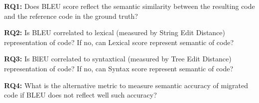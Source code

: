 \textbf{RQ1:} Does BLEU score reflect the semantic similarity between
the resulting code and the reference code in the ground truth?

\textbf{RQ2:} Is BLEU correlated to lexical (measured by String Edit
Distance) representation of code? If no, can Lexical score represent
semantic of code?

\textbf{RQ3:} Is BlEU correlated to syntaxtical (measured by Tree
Edit Distance) representation of code? If no, can Syntax score
represent semantic of code?

{\bf RQ4:} What is the alternative metric to measure semantic accuracy
of migrated code if BLEU does not reflect well such accuracy?
